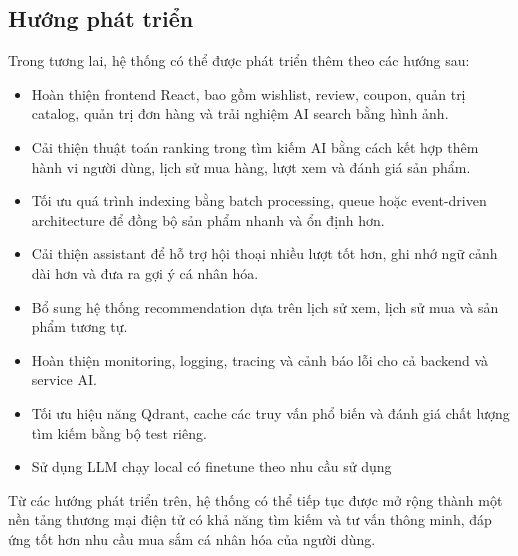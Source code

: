 \subsection{Hướng phát triển}

Trong tương lai, hệ thống có thể được phát triển thêm theo các hướng sau:

\begin{itemize}
    \item Hoàn thiện frontend React, bao gồm wishlist, review, coupon, quản trị catalog, quản trị đơn hàng và trải nghiệm AI search bằng hình ảnh.
    \item Cải thiện thuật toán ranking trong tìm kiếm AI bằng cách kết hợp thêm hành vi người dùng, lịch sử mua hàng, lượt xem và đánh giá sản phẩm.
    \item Tối ưu quá trình indexing bằng batch processing, queue hoặc event-driven architecture để đồng bộ sản phẩm nhanh và ổn định hơn.
    \item Cải thiện assistant để hỗ trợ hội thoại nhiều lượt tốt hơn, ghi nhớ ngữ cảnh dài hơn và đưa ra gợi ý cá nhân hóa.
    \item Bổ sung hệ thống recommendation dựa trên lịch sử xem, lịch sử mua và sản phẩm tương tự.
    \item Hoàn thiện monitoring, logging, tracing và cảnh báo lỗi cho cả backend và service AI.
    \item Tối ưu hiệu năng Qdrant, cache các truy vấn phổ biến và đánh giá chất lượng tìm kiếm bằng bộ test riêng.
    \item Sử dụng LLM chạy local có finetune theo nhu cầu sử dụng 
\end{itemize}

Từ các hướng phát triển trên, hệ thống có thể tiếp tục được mở rộng thành một nền tảng thương mại điện tử có khả năng tìm kiếm và tư vấn thông minh, đáp ứng tốt hơn nhu cầu mua sắm cá nhân hóa của người dùng.